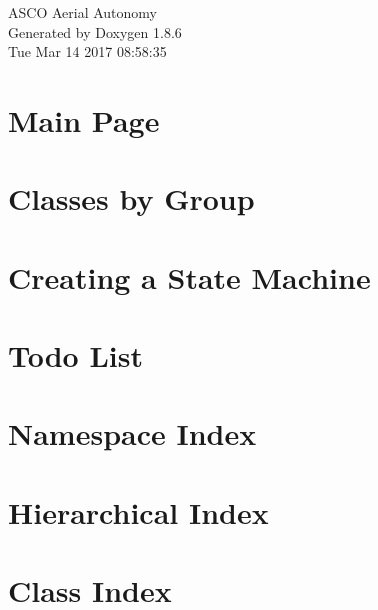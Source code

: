 \documentclass[twoside]{book}
\newcommand{\clearemptydoublepage}{%
  \newpage{\pagestyle{empty}\cleardoublepage}%
}
\begin{document}
\hypersetup{pageanchor=false}
\begin{titlepage}
\vspace*{7cm}
\begin{center}%
{\Large A\-S\-C\-O Aerial Autonomy }\\
\vspace*{1cm}
{\large Generated by Doxygen 1.8.6}\\
\vspace*{0.5cm}
{\small Tue Mar 14 2017 08:58:35}\\
\end{center}
\end{titlepage}
\clearemptydoublepage
\tableofcontents
\clearemptydoublepage
{}
\hypersetup{pageanchor=true}

\chapter{Main Page}
\label{index}\hypertarget{index}{}
\chapter{Classes by Group}
\label{md_markdown_scripts_class_groups}
\hypertarget{md_markdown_scripts_class_groups}{}

\chapter{Creating a State Machine}
\label{md_markdown_scripts_creating_state_machine}
\hypertarget{md_markdown_scripts_creating_state_machine}{}

\chapter{Todo List}
\label{todo}
\hypertarget{todo}{}

\chapter{Namespace Index}

\chapter{Hierarchical Index}

\chapter{Class Index}

\end{document}

